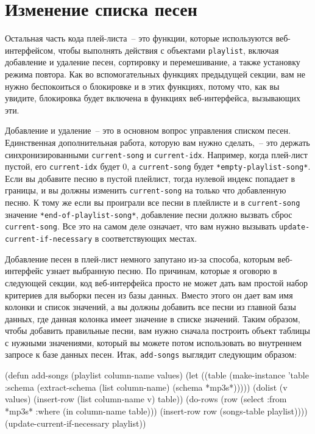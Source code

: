 \section{Изменение списка песен}
\label{ch29:change-song-list}

Остальная часть кода плей-листа~-- это функции, которые используются веб-интерфейсом, чтобы
выполнять действия с объектами \lstinline{playlist}, включая добавление и удаление песен,
сортировку и перемешивание, а также установку режима повтора. Как во вспомогательных
функциях предыдущей секции, вам не нужно беспокоиться о блокировке и в этих функциях,
потому что, как вы увидите, блокировка будет включена в функциях веб-интерфейса, вызывающих
эти.

Добавление и удаление~-- это в основном вопрос управления списком песен. Единственная
дополнительная работа, которую вам нужно сделать,~-- это держать синхронизированными
\lstinline{current-song} и \lstinline{current-idx}. Например, когда плей-лист пустой, его
\lstinline{current-idx} будет 0, а \lstinline{current-song} будет \lstinline{*empty-playlist-song*}. Если
вы добавите песню в пустой плейлист, тогда нулевой индекс попадает в границы, и вы должны
изменить \lstinline{current-song} на только что добавленную песню. К тому же если вы проиграли все
песни в плейлисте и в \lstinline{current-song} значение \lstinline{*end-of-playlist-song*},
добавление песни должно вызвать сброс \lstinline{current-song}. Все это на самом деле означает, что
вам нужно вызывать \lstinline{update-current-if-necessary} в соответствующих местах. 

Добавление песен в плей-лист немного запутано из-за способа, которым веб-интерфейс узнает
выбранную песню. По причинам, которые я оговорю в следующей секции, код веб-интерфейса просто
не может дать вам простой набор критериев для выборки песен из базы данных. Вместо этого он дает
вам имя колонки и список значений, а вы должны добавить все песни из главной базы данных,
где данная колонка имеет значение в списке значений. Таким образом, чтобы добавить
правильные песни, вам нужно сначала построить объект таблицы с нужными значениями, который
вы можете потом использовать во внутреннем запросе к базе данных песен. Итак,
\lstinline{add-songs} выглядит следующим образом:

\begin{myverb}
(defun add-songs (playlist column-name values)
  (let ((table (make-instance
                'table 
                :schema (extract-schema (list column-name) (schema *mp3s*)))))
    (dolist (v values) (insert-row (list column-name v) table))
    (do-rows (row (select :from *mp3s* :where (in column-name table)))
      (insert-row row (songs-table playlist))))
  (update-current-if-necessary playlist))
\end{myverb}

